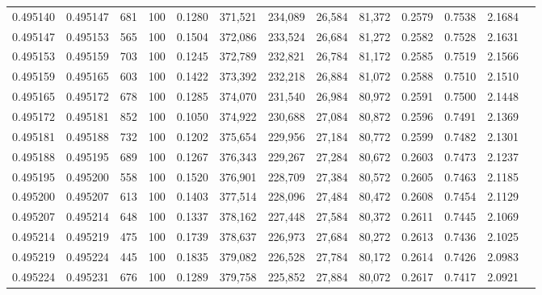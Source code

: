 \begin{tabular}{rrrrrrrrrrrrr}
0.495140 & 0.495147 &   681 & 100 &                                     0.1280 & 371,521 & 234,089 &  26,584 &  81,372 & 0.2579 & 0.7538 & 2.1684 \\
0.495147 & 0.495153 &   565 & 100 &                                     0.1504 & 372,086 & 233,524 &  26,684 &  81,272 & 0.2582 & 0.7528 & 2.1631 \\
0.495153 & 0.495159 &   703 & 100 &                                     0.1245 & 372,789 & 232,821 &  26,784 &  81,172 & 0.2585 & 0.7519 & 2.1566 \\
0.495159 & 0.495165 &   603 & 100 &                                     0.1422 & 373,392 & 232,218 &  26,884 &  81,072 & 0.2588 & 0.7510 & 2.1510 \\
0.495165 & 0.495172 &   678 & 100 &                                     0.1285 & 374,070 & 231,540 &  26,984 &  80,972 & 0.2591 & 0.7500 & 2.1448 \\
0.495172 & 0.495181 &   852 & 100 &                                     0.1050 & 374,922 & 230,688 &  27,084 &  80,872 & 0.2596 & 0.7491 & 2.1369 \\
0.495181 & 0.495188 &   732 & 100 &                                     0.1202 & 375,654 & 229,956 &  27,184 &  80,772 & 0.2599 & 0.7482 & 2.1301 \\
0.495188 & 0.495195 &   689 & 100 &                                     0.1267 & 376,343 & 229,267 &  27,284 &  80,672 & 0.2603 & 0.7473 & 2.1237 \\
0.495195 & 0.495200 &   558 & 100 &                                     0.1520 & 376,901 & 228,709 &  27,384 &  80,572 & 0.2605 & 0.7463 & 2.1185 \\
0.495200 & 0.495207 &   613 & 100 &                                     0.1403 & 377,514 & 228,096 &  27,484 &  80,472 & 0.2608 & 0.7454 & 2.1129 \\
0.495207 & 0.495214 &   648 & 100 &                                     0.1337 & 378,162 & 227,448 &  27,584 &  80,372 & 0.2611 & 0.7445 & 2.1069 \\
0.495214 & 0.495219 &   475 & 100 &                                     0.1739 & 378,637 & 226,973 &  27,684 &  80,272 & 0.2613 & 0.7436 & 2.1025 \\
0.495219 & 0.495224 &   445 & 100 &                                     0.1835 & 379,082 & 226,528 &  27,784 &  80,172 & 0.2614 & 0.7426 & 2.0983 \\
0.495224 & 0.495231 &   676 & 100 &                                     0.1289 & 379,758 & 225,852 &  27,884 &  80,072 & 0.2617 & 0.7417 & 2.0921 \\

\end{tabular}
